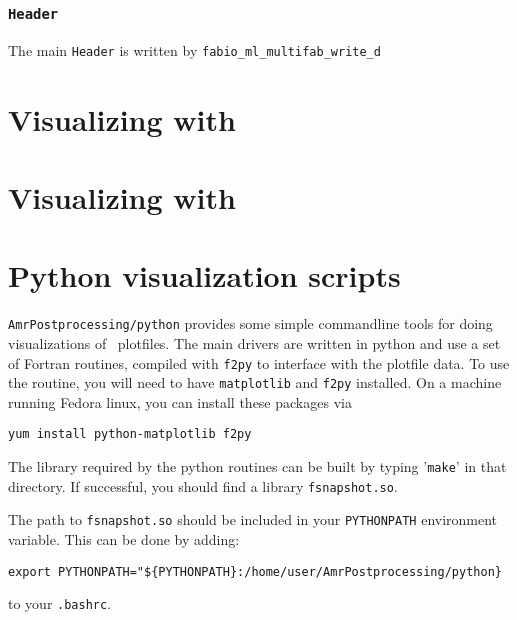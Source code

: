 \subsubsection{\tt Header}

The main {\tt Header} is written by {\tt fabio\_ml\_multifab\_write\_d}



\section{Visualizing with \amrvis}


\section{Visualizing with \visit}



\section{Python visualization scripts}
\label{sec:vis:python}


{\tt AmrPostprocessing/python} provides some simple commandline
tools for doing visualizations of \boxlib\ plotfiles.  The main drivers
are written in python and use a set of Fortran routines, compiled with
{\tt f2py} to interface with the plotfile data.  To use the routine,
you will need to have {\tt matplotlib} and {\tt f2py} installed.  On a
machine running Fedora linux, you can install these packages via
\begin{verbatim}   
yum install python-matplotlib f2py
\end{verbatim}
%
The library required by the python routines can be built by typing
'{\tt make}' in that directory.  If successful, you should find
a library {\tt fsnapshot.so}. 

The path to {\tt fsnapshot.so} should be included in your {\tt PYTHONPATH}
environment variable.  This can be done by adding:
\begin{verbatim}
export PYTHONPATH="${PYTHONPATH}:/home/user/AmrPostprocessing/python}
\end{verbatim}
to your {\tt .bashrc}.

